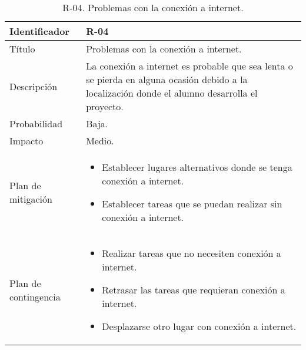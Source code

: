 \begin{table}[H]
  \centering
\begin{tabularx}{1\textwidth} { 
  | >{\centering\arraybackslash}X 
  | >{\centering\arraybackslash}X 
  |  }
 \hline
  Identificador & R-04 \\
 \hline
 Título & Problemas con la conexión a internet. \\
 \hline
 Descripción  & La conexión a internet es probable que sea lenta o se pierda en alguna ocasión debido a la localización donde el alumno desarrolla el proyecto.  \\
\hline
 Probabilidad  & Baja.    \\
 \hline
 Impacto  & Medio.  \\
 \hline
 Plan de mitigación  & \begin{itemize}
     \item Establecer lugares alternativos donde se tenga conexión a internet. 
      \item Establecer tareas que se puedan realizar sin conexión a internet.
 \end{itemize}   \\
 \hline
 Plan de contingencia  & \begin{itemize}
     \item Realizar tareas que no necesiten conexión a internet.
     \item Retrasar las tareas que requieran conexión a internet.
     \item Desplazarse otro lugar con conexión a internet.
     
      
 \end{itemize}   \\
 

  \hline
\end{tabularx}
\caption{R-04. Problemas con la conexión a internet.}
\label{table:R-04}
\end{table}





